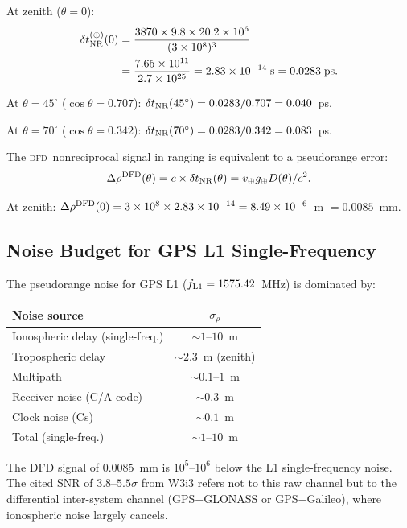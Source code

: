 \documentclass[aps,prd,twocolumn,superscriptaddress,nofootinbib]{revtex4-2}
\newcommand{\DFD}{\textsc{dfd}}
\newcommand{\deltaT}{\delta t_{\rm NR}}
\begin{document}
At zenith ($\theta = 0$):
\begin{align}
\deltaT^{(\oplus)}(0) &= \frac{3870\times9.8\times20.2\times10^6}{(3\times10^8)^3}
\nonumber\\
&= \frac{7.65\times10^{11}}{2.7\times10^{25}}
= 2.83\times10^{-14}\;\text{s} = 0.0283\;\text{ps}.
\label{eq:gps_timing_zenith}
\end{align}

At $\theta = 45^\circ$ ($\cos\theta = 0.707$):
$\deltaT(45^\circ) = 0.0283/0.707 = 0.040$~ps.

At $\theta = 70^\circ$ ($\cos\theta = 0.342$):
$\deltaT(70^\circ) = 0.0283/0.342 = 0.083$~ps.

The \DFD\ nonreciprocal signal in ranging is equivalent to a pseudorange error:
\begin{equation}
\Delta\rho^{\rm DFD}(\theta) = c\times\deltaT(\theta)
= v_\oplus g_\oplus D(\theta)/c^2.
\label{eq:pseudorange}
\end{equation}

At zenith: $\Delta\rho^{\rm DFD}(0) = 3\times10^8\times2.83\times10^{-14}
= 8.49\times10^{-6}$~m $= 0.0085$~mm.

\subsection{Noise Budget for GPS L1 Single-Frequency}

The pseudorange noise for GPS L1 ($f_{\rm L1} = 1575.42$~MHz) is dominated by:
\begin{center}
\begin{tabular}{lc}
\toprule
Noise source & $\sigma_\rho$ \\
\midrule
Ionospheric delay (single-freq.) & $\sim 1$--$10$~m \\
Tropospheric delay & $\sim 2.3$~m (zenith) \\
Multipath & $\sim 0.1$--$1$~m \\
Receiver noise (C/A code) & $\sim 0.3$~m \\
Clock noise (Cs) & $\sim 0.1$~m \\
\midrule
Total (single-freq.) & $\sim 1$--$10$~m \\
\bottomrule
\end{tabular}
\end{center}

The DFD signal of $0.0085$~mm is $10^5$--$10^6$ below the L1 single-frequency
noise. The cited SNR of $3.8$--$5.5\sigma$ from W3i3 refers not to this raw
channel but to the differential inter-system channel (GPS$-$GLONASS or
GPS$-$Galileo), where ionospheric noise largely cancels.
\end{document}
